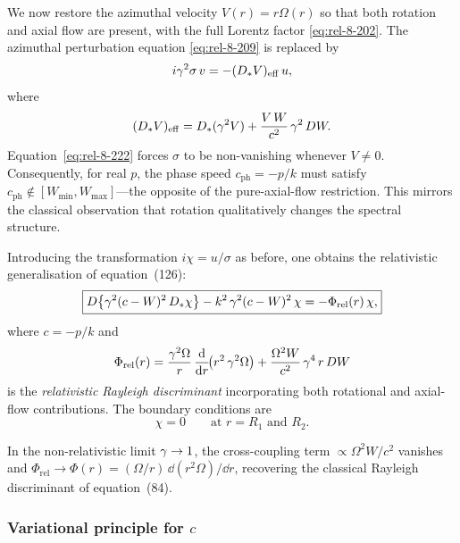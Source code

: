 We now restore the azimuthal velocity $V(r)=r\Omega(r)$ so that
both rotation and axial flow are present, with the full Lorentz
factor \eqref{eq:rel-8-202}.  The azimuthal perturbation equation
\eqref{eq:rel-8-209} is replaced by
\begin{equation}
\label{eq:rel-8-222}
i\gamma^{2}\sigma\,v = -(D_{*}V)_{\mathrm{eff}}\,u,
\end{equation}
where
\begin{equation}
\label{eq:rel-8-223}
(D_{*}V)_{\mathrm{eff}}
  = D_{*}(\gamma^{2}V)
  + \frac{V\,W}{c^{2}}\,\gamma^{2}\,DW.
\end{equation}
Equation~\eqref{eq:rel-8-222} forces $\sigma$ to be non-vanishing
whenever $V\neq 0$.  Consequently, for real $p$, the phase speed
$c_{\mathrm{ph}}=-p/k$ must satisfy $c_{\mathrm{ph}}\notin
[W_{\min},W_{\max}]$---the opposite of the pure-axial-flow
restriction.  This mirrors the classical observation that rotation
qualitatively changes the spectral structure.

Introducing the transformation $i\chi=u/\sigma$ as before, one
obtains the relativistic generalisation of equation~(126):
\begin{equation}
\label{eq:rel-8-224}
\boxed{
D\bigl\{\gamma^{2}(c-W)^{2}\,D_{*}\chi\bigr\}
  - k^{2}\,\gamma^{2}(c-W)^{2}\,\chi
  = -\Phi_{\mathrm{rel}}(r)\,\chi,
}
\end{equation}
where $c=-p/k$ and
\begin{equation}
\label{eq:rel-8-225}
\Phi_{\mathrm{rel}}(r)
  = \frac{\gamma^{2}\Omega}{r}\,
    \frac{\mathrm{d}}{\mathrm{d} r}\!\bigl(r^{2}\,\gamma^{2}\Omega\bigr)
  + \frac{\Omega^{2}W}{c^{2}}\,\gamma^{4}\,r\,DW
\end{equation}
is the \emph{relativistic Rayleigh discriminant} incorporating both
rotational and axial-flow contributions.  The boundary conditions are
\begin{equation}
\label{eq:rel-8-226}
\chi = 0 \qquad\text{at } r=R_{1}\text{ and }R_{2}.
\end{equation}

\begin{relcorrection}
In the non-relativistic limit $\gamma\to 1$, the cross-coupling term
$\propto \Omega^{2}W/c^{2}$ vanishes and
$\Phi_{\mathrm{rel}}\to\Phi(r)=(\Omega/r)\,\dd(r^{2}\Omega)/\dd r$,
recovering the classical Rayleigh discriminant of equation~(84).
\end{relcorrection}

\subsubsection{Variational principle for $c$}
\label{sec:rel-8-79c-i}

